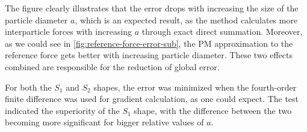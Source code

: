 The figure clearly illustrates that the error drops with increasing the size of the particle diameter $a$, which is an expected result, as the \PThreeM{} method calculates more interparticle forces with increasing $ a$ through exact direct summation.
Moreover, as we could see in \autoref{fig:reference-force-error-sub}, the PM approximation to the reference force gets better with increasing particle diameter.
These two effects combined are responsible for the reduction of global error.

For both the $S_1$ and $S_2$ shapes, the error was minimized when the fourth-order finite difference was used for gradient calculation, as one could expect.
The test indicated the superiority of the $S_1$ shape, with the difference between the two becoming more significant for bigger relative values of $a$.